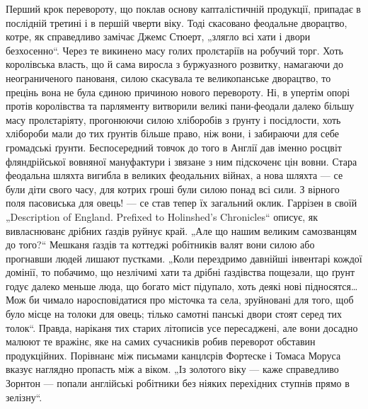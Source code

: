 
Перший крок перевороту, що поклав основу капталістичній продукції, припадає в послідній третині  і
в першій чверти  віку. Тоді скасовано феодальне дворацтво, котре, як справедливо замічає Джемс
Стюерт, „злягло  всі хати і двори безхосенно“. Через те викинено масу голих пролєтаріїв на
робучий торг. Хоть королівська власть, що й сама виросла з буржуазного розвитку, намагаючи до
неограниченого панованя, силою скасувала те великопанське дворацтво, то прецінь вона не була єдиною
причиною нового перевороту. Ні, в упертім опорі протів королівства та
парляменту витворили великі пани-феодали далеко більшу масу пролєтаріяту, прогонюючи силою
хліборобів з ґрунту і посідлости, хоть хлібороби мали до тих ґрунтів більше право, ніж вони, і
забираючи для себе громадські ґрунти. Беспосередний товчок до того в Англії дав іменно росцвіт
фляндрійської вовняної мануфактури і звязане з ним підскоченє цін вовни. Стара феодальна шляхта
вигибла в великих феодальних війнах, а нова шляхта — се були діти свого часу, для котрих гроші були
силою понад всі сили. З вірного поля пасовиська для овець! — се став тепер їх загальний оклик.
Гаррізен в своїй „Description of England. Prefixed to Holinshed’s Chronicles“ описує, як
вивласнюванє дрібних ґаздів руйнує край. „Але що нашим великим самозванцям до того?“ Мешканя ґаздів
та коттеджі робітників валят вони силою або прогнавши людей лишают пустками. „Коли перездримо
давнійші інвентарі кождої домінії, то побачимо, що незлічимі хати та дрібні ґаздівства пощезали, що
ґрунт годує далеко меньше люда, що богато міст підупало, хоть деякі нові підносятся\dots{} Мож би
чимало наросповідатися про місточка та села, зруйновані для того, щоб було місце на толоки для
овець; тілько самотні панські двори стоят серед тих толок“. Правда, наріканя тих старих літописів
усе пересаджені, але вони досадно малюют те вражінє, яке на самих сучасників робив переворот
обставин продукційних. Порівнанє між письмами канцлєрів Фортеске і Томаса Моруса вказує наглядно
пропасть між  а  віком. „Із золотого віку — каже справедливо Зорнтон — попали англійські
робітники без ніяких перехідних ступнів прямо в зелізну“.

